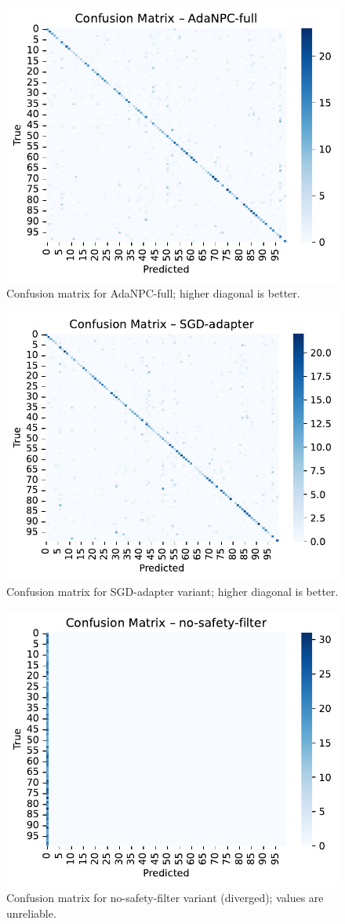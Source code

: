 \documentclass{article} %
\begin{document}
\begin{figure}[H]
  \centering
  \includegraphics[width=0.7\linewidth]{images/confusion_AdaNPC-full.pdf}
  \caption{Confusion matrix for AdaNPC-full; higher diagonal is better.}
\end{figure}
\begin{figure}[H]
  \centering
  \includegraphics[width=0.7\linewidth]{images/confusion_SGD-adapter.pdf}
  \caption{Confusion matrix for SGD-adapter variant; higher diagonal is better.}
\end{figure}
\begin{figure}[H]
  \centering
  \includegraphics[width=0.7\linewidth]{images/confusion_no-safety-filter.pdf}
  \caption{Confusion matrix for no-safety-filter variant (diverged); values are unreliable.}
\end{figure}
\end{document}
